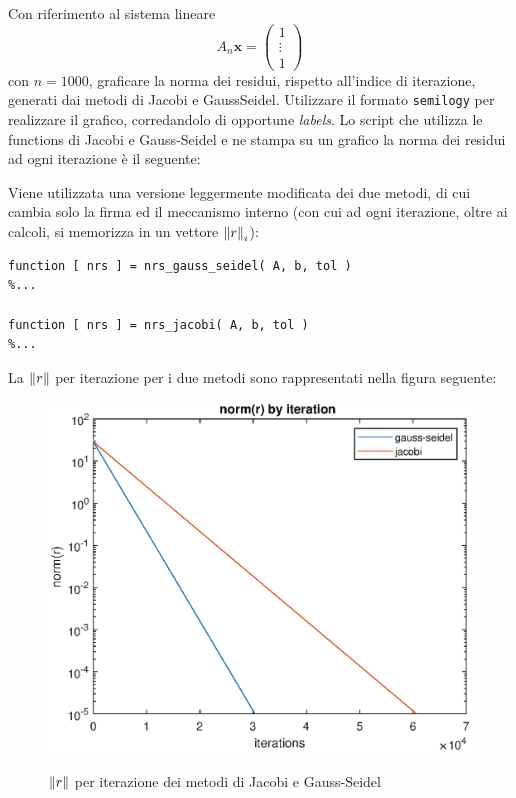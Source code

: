 Con riferimento al sistema lineare
\begin{equation*}
	A_n \mathbf{x} = \begin{pmatrix} 1 \\ \vdots \\ 1 \end{pmatrix}
\end{equation*}
con $n = 1000$, graficare la norma dei residui, rispetto all’indice di iterazione, generati dai metodi di Jacobi e GaussSeidel.
Utilizzare il formato \lstinline{semilogy} per realizzare il grafico, corredandolo di opportune \textit{labels}.
\PP
Lo script che utilizza le functions di Jacobi e Gauss-Seidel e ne stampa su un grafico la norma dei residui ad ogni iterazione è il seguente:

Viene utilizzata una versione leggermente modificata dei due metodi, di cui cambia solo la firma ed il meccanismo interno (con cui ad ogni iterazione, oltre ai calcoli, si memorizza in un vettore $\norm{r}_i$):
\begin{lstlisting}[frame=single]
function [ nrs ] = nrs_gauss_seidel( A, b, tol )
%...

function [ nrs ] = nrs_jacobi( A, b, tol )
%...
\end{lstlisting}

La $\norm{r}$ per iterazione per i due metodi sono rappresentati nella figura seguente:
\begin{figure}[h!]
    \centering
    \includegraphics[scale=0.7]{./capitolo_6/exercise_6_5}
    \label{fig:6_5_jacobi}
    \caption{$\norm{r}$ per iterazione dei metodi di Jacobi e Gauss-Seidel}
\end{figure}